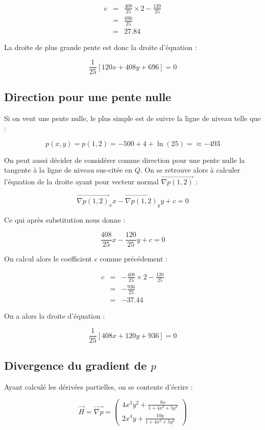 \documentclass[a4paper, 11pt]{report} %
\newcommand{\vect}{\overrightarrow}
\begin{document}
\begin{eqnarray*}
    c & = & \frac{408}{25}\times 2 - \frac{120}{25}\\
      & = & \frac{696}{25}\\
      & = & 27.84
\end{eqnarray*}

La droite de plus grande pente est donc la droite d'équation :

\[
    \frac{1}{25}\left[120x+408y+696\right] = 0
\]

\subsection{Direction pour une pente nulle}

Si on veut une pente nulle, le plus simple est de suivre la ligne de niveau telle que :

\[
    p(x,y) = p(1,2) = -500+4+\ln(25) = \approx -493
\]

On peut aussi décider de considérer comme direction pour une pente nulle la tangente à la ligne de niveau sus-citée en
$Q$. On se retrouve alors à calculer l'équation de la droite ayant pour vecteur normal $\vect{\nabla p(1,2)}$ :

\[
    \vect{\nabla p(1,2)}_xx - \vect{\nabla p(1,2)}_yy + c = 0
\]

Ce qui après substitution nous donne :

\[
    \frac{408}{25}x - \frac{120}{25}y + c = 0
\]

On calcul alors le coefficient $c$ comme précédement :


\begin{eqnarray*}
    c & = & - \frac{408}{25}\times 2 - \frac{120}{25}\\
      & = & -\frac{936}{25}\\
      & = & -37.44
\end{eqnarray*}

On a alors la droite d'équation :

\[
    \frac{1}{25}\left[408x+120y+936\right] = 0
\]

\subsection{Divergence du gradient de $p$}

Ayant calculé les dérivées partielles, on se contente d'écrire :

\[
    \vect{H} = \vect{\nabla p} = \begin{pmatrix}
        4x^3y^2 + \frac{8x}{1+4x^2+5y^2}\\
        2x^4y + \frac{10y}{1+4x^2+5y^2}
    \end{pmatrix}
\]
\end{document}
